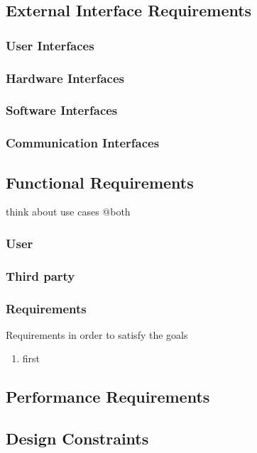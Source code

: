 \subsection{External Interface Requirements}
\subsubsection{User Interfaces}
\subsubsection{Hardware Interfaces}
\subsubsection{Software Interfaces}
\subsubsection{Communication Interfaces}


\subsection{Functional  Requirements}


think about use cases @both

\subsubsection{User}
\subsubsection{Third party}

\subsubsection{Requirements}
Requirements in order to satisfy the goals
\begin{enumerate}[label=R]
\item first
\end{enumerate}



\subsection{Performance Requirements}


\subsection{Design Constraints}%
